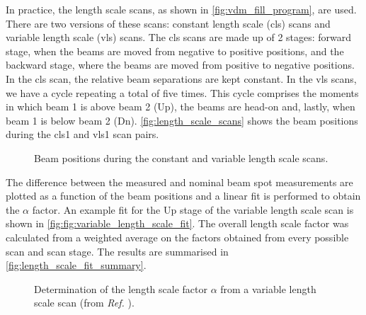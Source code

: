 In practice, the length scale scans, as shown in \autoref{fig:vdm_fill_program}, are used. There are two versions of these scans: constant length scale (cls) scans and variable length scale (vls) scans. The cls scans are made up of 2 stages: forward stage, when the beams are moved from negative to positive positions, and the backward stage, where the beams are moved from positive to negative positions. In the cls scan, the relative beam separations are kept constant. In the vls scans, we have a cycle repeating a total of five times. This cycle comprises the moments in which beam 1 is above beam 2 (Up), the beams are head-on and, lastly, when beam 1 is below beam 2 (Dn). \autoref{fig:length_scale_scans} shows the beam positions during the cls1 and vls1 scan pairs.

\begin{figure}[!htb]
	\centering
	\caption[Beam positions in length scale scans]{Beam positions during the constant and variable length scale scans.}
	\label{fig:length_scale_scans}
\end{figure}

The difference between the measured and nominal beam spot measurements are plotted as a function of the beam positions and a linear fit is performed to obtain the $\alpha$ factor. An example fit for the Up stage of the variable length scale scan is shown in \autoref{fig:fig:variable_length_scale_fit}. The overall length scale factor was calculated from a weighted average on the factors obtained from every possible scan and scan stage. The results are summarised in \autoref{fig:length_scale_fit_summary}.

\begin{figure}[!htb]
	\centering
	\caption[Length scale factor determination]{Determination of the length scale factor $\alpha$ from a variable length scale scan (from \textit{Ref.} \cite{CMS-DP-2024-068}).}
	\label{fig:fig:variable_length_scale_fit}
\end{figure}

